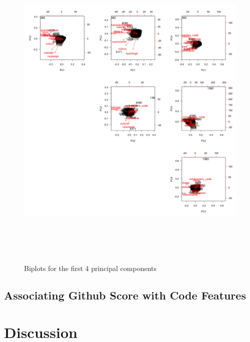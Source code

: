 \documentclass[12pt]{article}\usepackage[]{graphicx}\usepackage[]{color}
\begin{document}
\begin{figure}[H]
\centering
\includegraphics[width=16cm,height=16cm]{biplots}
\caption{Biplots for the first 4 principal components}
\end{figure}







\subsection{Associating Github Score with Code Features}




\section{Discussion}
\label{discussion}


% 
% 
% 
\end{document}
